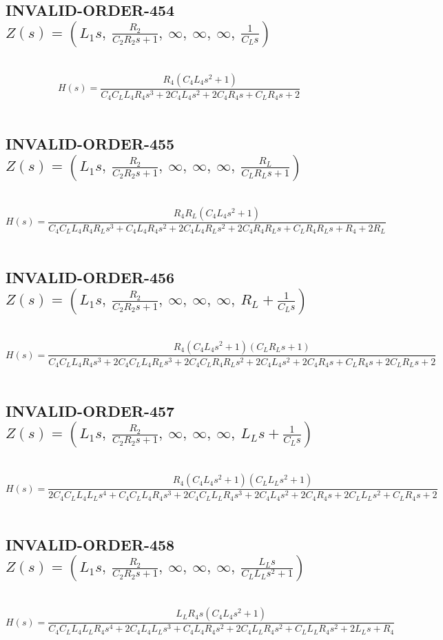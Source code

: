 \documentclass{article}
\begin{document}
\subsection{INVALID-ORDER-454 $Z(s) = \left( L_{1} s, \  \frac{R_{2}}{C_{2} R_{2} s + 1}, \  \infty, \  \infty, \  \infty, \  \frac{1}{C_{L} s}\right)$ } \ 
\textbf{\[H(s) = \frac{R_{4} \left(C_{4} L_{4} s^{2} + 1\right)}{C_{4} C_{L} L_{4} R_{4} s^{3} + 2 C_{4} L_{4} s^{2} + 2 C_{4} R_{4} s + C_{L} R_{4} s + 2}\] } \ 
\subsection{INVALID-ORDER-455 $Z(s) = \left( L_{1} s, \  \frac{R_{2}}{C_{2} R_{2} s + 1}, \  \infty, \  \infty, \  \infty, \  \frac{R_{L}}{C_{L} R_{L} s + 1}\right)$ } \ 
\textbf{\[H(s) = \frac{R_{4} R_{L} \left(C_{4} L_{4} s^{2} + 1\right)}{C_{4} C_{L} L_{4} R_{4} R_{L} s^{3} + C_{4} L_{4} R_{4} s^{2} + 2 C_{4} L_{4} R_{L} s^{2} + 2 C_{4} R_{4} R_{L} s + C_{L} R_{4} R_{L} s + R_{4} + 2 R_{L}}\] } \ 
\subsection{INVALID-ORDER-456 $Z(s) = \left( L_{1} s, \  \frac{R_{2}}{C_{2} R_{2} s + 1}, \  \infty, \  \infty, \  \infty, \  R_{L} + \frac{1}{C_{L} s}\right)$ } \ 
\textbf{\[H(s) = \frac{R_{4} \left(C_{4} L_{4} s^{2} + 1\right) \left(C_{L} R_{L} s + 1\right)}{C_{4} C_{L} L_{4} R_{4} s^{3} + 2 C_{4} C_{L} L_{4} R_{L} s^{3} + 2 C_{4} C_{L} R_{4} R_{L} s^{2} + 2 C_{4} L_{4} s^{2} + 2 C_{4} R_{4} s + C_{L} R_{4} s + 2 C_{L} R_{L} s + 2}\] } \ 
\subsection{INVALID-ORDER-457 $Z(s) = \left( L_{1} s, \  \frac{R_{2}}{C_{2} R_{2} s + 1}, \  \infty, \  \infty, \  \infty, \  L_{L} s + \frac{1}{C_{L} s}\right)$ } \ 
\textbf{\[H(s) = \frac{R_{4} \left(C_{4} L_{4} s^{2} + 1\right) \left(C_{L} L_{L} s^{2} + 1\right)}{2 C_{4} C_{L} L_{4} L_{L} s^{4} + C_{4} C_{L} L_{4} R_{4} s^{3} + 2 C_{4} C_{L} L_{L} R_{4} s^{3} + 2 C_{4} L_{4} s^{2} + 2 C_{4} R_{4} s + 2 C_{L} L_{L} s^{2} + C_{L} R_{4} s + 2}\] } \ 
\subsection{INVALID-ORDER-458 $Z(s) = \left( L_{1} s, \  \frac{R_{2}}{C_{2} R_{2} s + 1}, \  \infty, \  \infty, \  \infty, \  \frac{L_{L} s}{C_{L} L_{L} s^{2} + 1}\right)$ } \ 
\textbf{\[H(s) = \frac{L_{L} R_{4} s \left(C_{4} L_{4} s^{2} + 1\right)}{C_{4} C_{L} L_{4} L_{L} R_{4} s^{4} + 2 C_{4} L_{4} L_{L} s^{3} + C_{4} L_{4} R_{4} s^{2} + 2 C_{4} L_{L} R_{4} s^{2} + C_{L} L_{L} R_{4} s^{2} + 2 L_{L} s + R_{4}}\] } \ 
\end{document}
